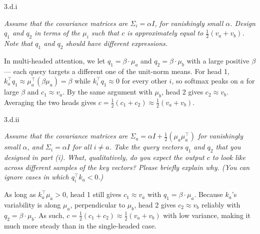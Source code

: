 
\clearpage

\LARGE
3.d.i
\normalsize

\textit{Assume that the covariance matrices are $\Sigma_i = \alpha I$, for vanishingly small $\alpha$. Design $q_1$ and $q_2$ in terms of the $\mu_i$ such that $c$ is approximately equal to $\frac{1}{2}(v_a + v_b)$. Note that $q_1$ and $q_2$ should have different expressions.}

\bigskip


\begin{answer}
    In multi-headed attention, we let $q_1 = \beta \cdot \mu_a$ and $q_2 = \beta \cdot \mu_b$ with a large positive $\beta$ --- each query targets a different one of the unit-norm means. For head 1, $k_a^\top q_1 \approx \mu_a^\top (\beta \mu_a) = \beta$ while $k_i^\top q_1 \approx 0$ for every other $i$, so softmax peaks on $a$ for large $\beta$ and $c_1 \approx v_a$. By the same argument with $\mu_b$, head 2 gives $c_2 \approx v_b$. Averaging the two heads gives $c = \frac{1}{2}(c_1 + c_2) \approx \frac{1}{2}(v_a + v_b)$.
\end{answer}


\clearpage

\LARGE
3.d.ii
\normalsize

\textit{Assume that the covariance matrices are $\Sigma_a = \alpha I + \frac{1}{2}(\mu_a \mu_a^\top)$ for vanishingly small $\alpha$, and $\Sigma_i = \alpha I$ for all $i \neq a$. Take the query vectors $q_1$ and $q_2$ that you designed in part (i). What, qualitatively, do you expect the output $c$ to look like across different samples of the key vectors? Please briefly explain why. (You can ignore cases in which $q_i^\top k_a < 0$.)}

\bigskip


\begin{answer}
    As long as $k_a^\top \mu_a > 0$, head 1 still gives $c_1 \approx v_a$ with $q_1 = \beta \cdot \mu_a$. Because $k_a$'s variability is along $\mu_a$, perpendicular to $\mu_b$, head 2 gives $c_2 \approx v_b$ reliably with $q_2 = \beta \cdot \mu_b$. As such, $c = \frac{1}{2}(c_1 + c_2) \approx \frac{1}{2}(v_a + v_b)$ with low variance, making it much more steady than in the single-headed case.
\end{answer}

